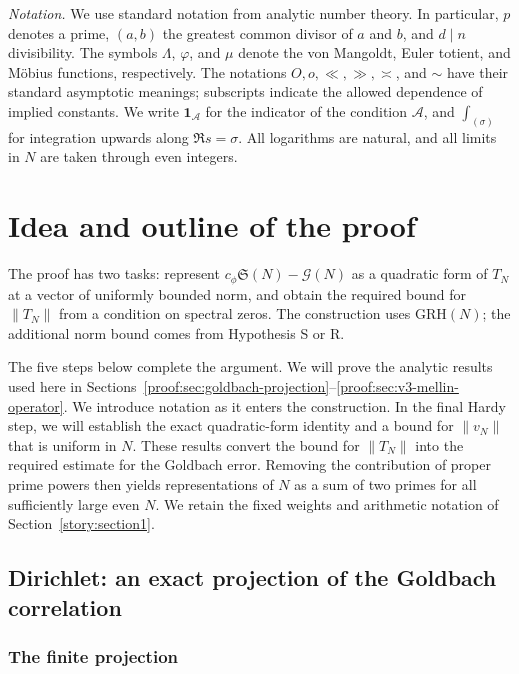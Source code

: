 \documentclass[12pt,a4paper]{amsart}
\numberwithin{equation}{section}
\theoremstyle{plain}
\theoremstyle{definition}
\theoremstyle{remark}
\begin{document}
\medskip\noindent\textit{Notation.}
We use standard notation from analytic number theory. In
particular, $p$ denotes a prime, $(a,b)$ the greatest common
divisor of $a$ and $b$, and $d\mid n$ divisibility.
The symbols $\Lambda$, $\varphi$, and $\mu$ denote the von
Mangoldt, Euler totient, and M\"obius functions, respectively.
The notations $O,o,\ll,\gg,\asymp$, and $\sim$ have their
standard asymptotic meanings; subscripts indicate the allowed
dependence of implied constants.
We write $\mathbf1_{\mathcal A}$ for the indicator of the
condition $\mathcal A$, and $\int_{(\sigma)}$ for integration
upwards along $\Re s=\sigma$.
All logarithms are natural, and all limits in $N$ are taken
through even integers.

\section{Idea and outline of the proof}\label{story:section2}

The proof has two tasks: represent
$c_\phi\mathfrak S(N)-\mathcal G(N)$ as a quadratic form of
$T_N$ at a vector of uniformly bounded norm, and obtain the
required bound for $\|T_N\|$ from a condition on spectral zeros.
The construction uses $\mathrm{GRH}(N)$; the additional norm
bound comes from Hypothesis S or R.

The five steps below complete the argument. We will prove the analytic
results used here in
Sections~\ref{proof:sec:goldbach-projection}--\ref{proof:sec:v3-mellin-operator}.
We introduce notation as it enters the construction. In the final Hardy
step, we will establish the exact quadratic-form identity and a bound for
$\|v_N\|$ that is uniform in $N$. These results convert the bound for $\|T_N\|$ into
the required estimate for the Goldbach error. Removing the contribution
of proper prime powers then yields representations of $N$ as a sum of
two primes for all sufficiently large even $N$.
We retain the fixed weights and arithmetic notation of Section~\ref{story:section1}.

\subsection{Dirichlet: an exact projection of the Goldbach correlation}
\label{story:dirichlet}

\subsubsection{The finite projection}
\end{document}

